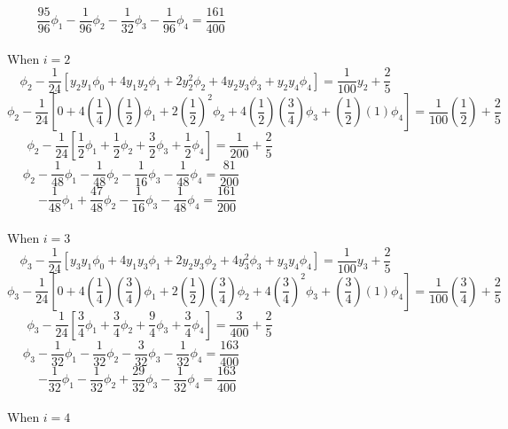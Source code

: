 \documentclass[a4paper,12pt]{report}
\begin{document}
	\begin{equation}
		\frac{95}{96}\phi_1 -\frac{1}{96}\phi_2 - \frac{1}{32}\phi_3 - \frac{1}{96}\phi_4 = \frac{161}{400} \qquad\qquad\qquad\qquad\qquad\qquad\quad\qquad\quad \tag{ii}
	\end{equation}
	\\When $i=2$
	$$
	\phi_2 - \frac{1}{24} \left[y_2y_1 \phi_0 + 4y_1y_2\phi_1 + 2y_2^2\phi_2 + 4y_2y_3\phi_3 + y_2y_4\phi_4\right]	= \frac{1}{100}y_2 + \frac{2}{5}\qquad\qquad
	$$
	$$
	\phi_2 - \frac{1}{24} \left[0 + 4\left(\frac{1}{4}\right)\left(\frac{1}{2}\right)\phi_1 + 2\left(\frac{1}{2}\right)^2\phi_2 + 4\left(\frac{1}{2}\right)\left(\frac{3}{4}\right)\phi_3 + \left(\frac{1}{2}\right)(1)\phi_4\right] = \frac{1}{100}\left(\frac{1}{2}\right)+\frac{2}{5}
	$$
	$$
	\phi_2 - \frac{1}{24} \left[\frac{1}{2}\phi_1 +\frac{1}{2}\phi_2 + \frac{3}{2}\phi_3 + \frac{1}{2}\phi_4\right] = \frac{1}{200}+\frac{2}{5} \qquad\qquad\qquad\qquad\qquad\qquad\quad
	$$
	$$
	\phi_2 - \frac{1}{48}\phi_1 -\frac{1}{48}\phi_2 - \frac{1}{16}\phi_3 - \frac{1}{48}\phi_4 = \frac{81}{200} \qquad\qquad\qquad\qquad\qquad\qquad\quad\qquad\quad
	$$
	\begin{equation}
		-\frac{1}{48}\phi_1 +\frac{47}{48}\phi_2 - \frac{1}{16}\phi_3 - \frac{1}{48}\phi_4 = \frac{161}{200} \qquad\qquad\qquad\qquad\qquad\qquad\quad\qquad \tag{iii}
	\end{equation}
	\\When $i=3$
	$$
	\phi_3 - \frac{1}{24} \left[y_3y_1 \phi_0 + 4y_1y_3\phi_1 + 2y_2y_3\phi_2 + 4y_3^2\phi_3 + y_3y_4\phi_4\right]	= \frac{1}{100}y_3 + \frac{2}{5}\qquad\qquad
	$$
	$$
	\phi_3 - \frac{1}{24} \left[0 + 4\left(\frac{1}{4}\right)\left(\frac{3}{4}\right)\phi_1 + 2\left(\frac{1}{2}\right)\left(\frac{3}{4}\right)\phi_2 + 4\left(\frac{3}{4}\right)^2\phi_3 + \left(\frac{3}{4}\right)(1)\phi_4\right] = \frac{1}{100}\left(\frac{3}{4}\right)+\frac{2}{5}
	$$
	$$
	\phi_3 - \frac{1}{24} \left[\frac{3}{4}\phi_1 +\frac{3}{4}\phi_2 + \frac{9}{4}\phi_3 + \frac{3}{4}\phi_4\right] = \frac{3}{400}+\frac{2}{5} \qquad\qquad\qquad\qquad\qquad\qquad\quad
	$$
	$$
	\phi_3 - \frac{1}{32}\phi_1 -\frac{1}{32}\phi_2 - \frac{3}{32}\phi_3 - \frac{1}{32}\phi_4 = \frac{163}{400} \qquad\qquad\qquad\qquad\qquad\qquad\quad\qquad\quad
	$$
	\begin{equation}
		-\frac{1}{32}\phi_1 -\frac{1}{32}\phi_2 + \frac{29}{32}\phi_3 - \frac{1}{32}\phi_4 = \frac{163}{400} \qquad\qquad\qquad\qquad\qquad\qquad\quad\qquad \tag{iv}
	\end{equation}
	\\When $i=4$
\end{document}
